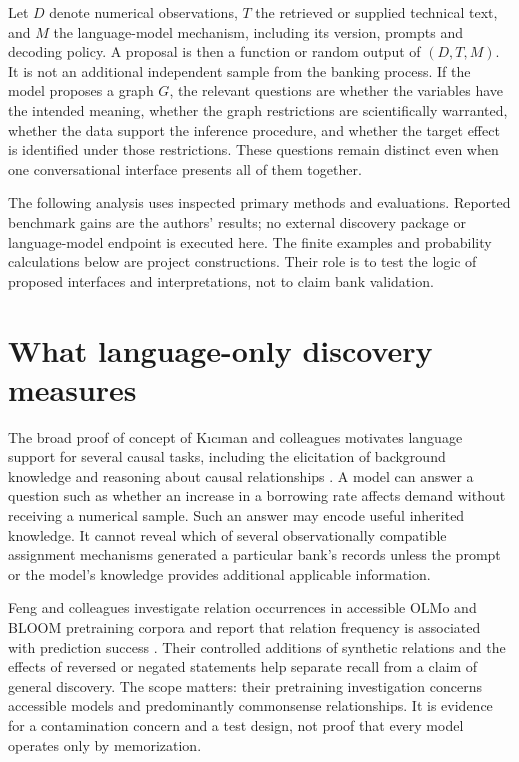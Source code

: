 Let $D$ denote numerical observations, $T$ the retrieved or supplied technical
text, and $M$ the language-model mechanism, including its version, prompts and
decoding policy. A proposal is then a function or random output of
$(D,T,M)$. It is not an additional independent sample from the banking process.
If the model proposes a graph $G$, the relevant questions are whether the
variables have the intended meaning, whether the graph restrictions are
scientifically warranted, whether the data support the inference procedure,
and whether the target effect is identified under those restrictions. These
questions remain distinct even when one conversational interface presents all
of them together.

The following analysis uses inspected primary methods and evaluations. Reported
benchmark gains are the authors' results; no external discovery package or
language-model endpoint is executed here. The finite examples and probability
calculations below are project constructions. Their role is to test the logic
of proposed interfaces and interpretations, not to claim bank validation.

\section{What language-only discovery measures}

The broad proof of concept of K{\i}c{\i}man and colleagues motivates language
support for several causal tasks, including the elicitation of background
knowledge and reasoning about causal relationships
\cite{v12_la_2305_00050}. A model can answer a question such as whether an
increase in a borrowing rate affects demand without receiving a numerical
sample. Such an answer may encode useful inherited knowledge. It cannot reveal
which of several observationally compatible assignment mechanisms generated a
particular bank's records unless the prompt or the model's knowledge provides
additional applicable information.

Feng and colleagues investigate relation occurrences in accessible OLMo and
BLOOM pretraining corpora and report that relation frequency is associated with
prediction success \cite{v12_la_2407_19638}. Their controlled additions of
synthetic relations and the effects of reversed or negated statements help
separate recall from a claim of general discovery. The scope matters: their
pretraining investigation concerns accessible models and predominantly
commonsense relationships. It is evidence for a contamination concern and a
test design, not proof that every model operates only by memorization.

